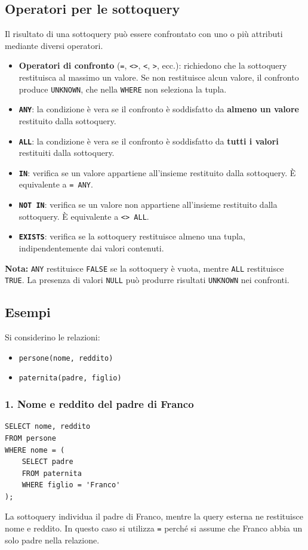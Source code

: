 \subsection{Operatori per le sottoquery}
Il risultato di una sottoquery può essere confrontato con uno o più attributi mediante diversi operatori.
\begin{itemize}
    \item \textbf{Operatori di confronto} (\texttt{=}, \texttt{<>}, \texttt{<}, \texttt{>}, ecc.): richiedono che la sottoquery restituisca al massimo un valore. Se non restituisce alcun valore, il confronto produce \texttt{UNKNOWN}, che nella \texttt{WHERE} non seleziona la tupla.
    \item \textbf{\texttt{ANY}}: la condizione è vera se il confronto è soddisfatto da \textbf{almeno un valore} restituito dalla sottoquery.
    \item \textbf{\texttt{ALL}}: la condizione è vera se il confronto è soddisfatto da \textbf{tutti i valori} restituiti dalla sottoquery.
    \item \textbf{\texttt{IN}}: verifica se un valore appartiene all'insieme restituito dalla sottoquery. È equivalente a \texttt{= ANY}.
    \item \textbf{\texttt{NOT IN}}: verifica se un valore non appartiene all'insieme restituito dalla sottoquery. È equivalente a \texttt{<> ALL}.
    \item \textbf{\texttt{EXISTS}}: verifica se la sottoquery restituisce almeno una tupla, indipendentemente dai valori contenuti.
\end{itemize}
\noindent
\textbf{Nota:} \texttt{ANY} restituisce \texttt{FALSE} se la sottoquery è vuota, mentre \texttt{ALL} restituisce \texttt{TRUE}. La presenza di valori \texttt{NULL} può produrre risultati \texttt{UNKNOWN} nei confronti.
\subsection{Esempi}
Si considerino le relazioni:
\begin{itemize}
    \item \texttt{persone(nome, reddito)}
    \item \texttt{paternita(padre, figlio)}
\end{itemize}
\subsubsection{1. Nome e reddito del padre di Franco}
\begin{verbatim}
SELECT nome, reddito
FROM persone
WHERE nome = (
    SELECT padre
    FROM paternita
    WHERE figlio = 'Franco'
);
\end{verbatim}
La sottoquery individua il padre di Franco, mentre la query esterna ne restituisce nome e reddito.
In questo caso si utilizza \texttt{=} perché si assume che Franco abbia un solo padre nella relazione.
